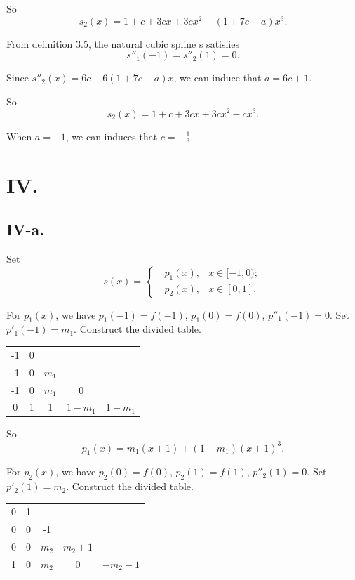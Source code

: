 \documentclass[a4paper]{article}
\begin{document}
So $$s_2(x)=1+c+3cx+3cx^2-(1+7c-a)x^3.$$

From definition 3.5, the natural cubic spline s satisfies 
$$s''_1(-1)=s''_2(1)=0.$$

Since $s''_2(x)=6c-6(1+7c-a)x$, we can induce that $a=6c+1$.

So $$s_2(x)=1+c+3cx+3cx^2-cx^3.$$

When $a=-1$, we can induces that $c=-\frac{1}{3}$.

\section*{IV.}
\subsection*{IV-a.}
Set 
$$
s(x)=\left\{
\begin{aligned}
  &p_1(x), &x\in [-1,0);\\
  &p_2(x), &x\in [0,1].
\end{aligned}
\right.
$$

For $p_1(x)$, we have $p_1(-1)=f(-1)$, $p_1(0)=f(0)$, $p''_1(-1)=0$. Set $p'_1(-1)=m_1$. Construct the divided table.

\begin{table}[H]
  \centering
  \begin{tabular}{c|cccc}
    -1 & 0 & & & \\
    -1 & 0 & $m_1$ & &  \\
    -1 & 0 & $m_1$ & 0 & \\
    0 & 1 & 1 & $1-m_1$ & $1-m_1$ \\
  \end{tabular}
\end{table}

So $$p_1(x)=m_1(x+1)+(1-m_1)(x+1)^3.$$

For $p_2(x)$, we have $p_2(0)=f(0)$, $p_2(1)=f(1)$, $p''_2(1)=0$. Set $p'_2(1)=m_2$. Construct the divided table.

\begin{table}[H]
  \centering
  \begin{tabular}{c|cccc}
    0 & 1 & & & \\
    0 & 0 & -1 & &  \\
    0 & 0 & $m_2$ & $m_2+1$ & \\
    1 & 0 & $m_2$ & 0 & $-m_2-1$ \\
  \end{tabular}
\end{table}
\end{document}
